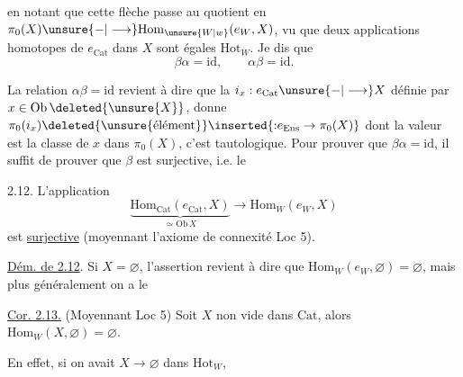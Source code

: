 
en notant que cette flèche passe au quotient en $\pi_0(X)\unsure{-|\longrightarrow}\mathrm{Hom}_{\unsure{W|w}}(e_W,X)$, vu que deux applications homotopes de $e_{\mathrm{Cat}}$ dans $X$ sont égales  $\mathrm{Hot}_W$. Je dis que 
\[
\beta\alpha=\mathrm{id},\qquad\alpha\beta=\mathrm{id}.
\]

La relation $\alpha\beta=\mathrm{id}$ revient à dire que la  $i_x:e_{\mathrm{Cat}}\unsure{-|\longrightarrow}X$ définie par $x\in\mathrm{Ob}\,\deleted{\unsure{X}}$,  donne $\pi_0(i_x)\deleted{\unsure{\text{élément}}}\inserted{{:}e_{\mathrm{Ens}}\to\pi_0(X)}$  dont la valeur est la classe de $x$ dans $\pi_0(X)$, c'est tautologique. Pour prouver que $\beta\alpha=\mathrm{id}$, il suffit  de prouver que $\beta$ est surjective, i.e. le

\uline{} 2.12.  L'application
\[
\underbrace{\mathrm{Hom}_{\mathrm{Cat}}(e_{\mathrm{Cat}},X)}_{\simeq\mathrm{Ob}\,X}
\longrightarrow\mathrm{Hom}_W(e_W,X)
\]
est \uline{surjective}  (moyennant l'axiome de connexité Loc 5).


\uline{Dém. de 2.12}. Si $X=\varnothing$, l'assertion revient à dire que $\mathrm{Hom}_W(e_W,\varnothing)=\varnothing$,   mais plus généralement on a le

\uline{Cor. 2.13.} (Moyennant Loc 5) Soit $X$ non vide dans $\mathrm{Cat}$, alors $\mathrm{Hom}_W(X,\varnothing)=\varnothing$. 

En effet, si on avait $X\to\varnothing$ dans $\mathrm{Hot}_W$,
